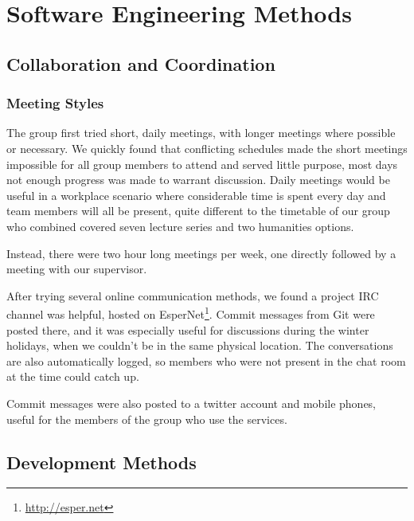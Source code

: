 \chapter{Software Engineering Methods}

\section{Collaboration and Coordination}

  \subsection{Meeting Styles}
    The group first tried short, daily meetings, with longer meetings where possible or necessary.
    We quickly found that conflicting schedules made the short meetings impossible for all group members to attend and served little purpose, most days not enough progress was made to warrant discussion.
    Daily meetings would be useful in a workplace scenario where considerable time is spent every day and team members will all be present, quite different to the timetable of our group who combined covered seven lecture series and two humanities options.

    Instead, there were two hour long meetings per week, one directly followed by a meeting with our supervisor.

    After trying several online communication methods, we found a project IRC channel was helpful, hosted on EsperNet\footnote{\url{http://esper.net}}.
    Commit messages from Git were posted there, and it was especially useful for discussions during the winter holidays, when we couldn't be in the same physical location. The conversations are also automatically logged, so members who were not present in the chat room at the time could catch up.

    Commit messages were also posted to a twitter account and mobile phones, useful for the members of the group who use the services.

\section{Development Methods}


